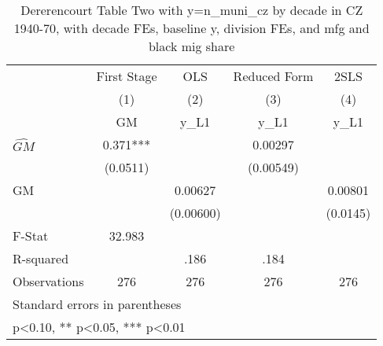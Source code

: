 \begin{table}[htbp]\centering
\def\sym#1{\ifmmode^{#1}\else\(^{#1}\)\fi}
\caption{Dererencourt Table Two with y=n\_muni\_cz by decade in CZ 1940-70, with decade FEs, baseline y, division FEs, and mfg and black mig share}
\begin{tabular}{l*{4}{c}}
\toprule
                    & First Stage   &         OLS   &Reduced Form   &        2SLS   \\
                    &\multicolumn{1}{c}{(1)}&\multicolumn{1}{c}{(2)}&\multicolumn{1}{c}{(3)}&\multicolumn{1}{c}{(4)}\\
                    &\multicolumn{1}{c}{GM}&\multicolumn{1}{c}{y\_L1}&\multicolumn{1}{c}{y\_L1}&\multicolumn{1}{c}{y\_L1}\\
\midrule
$\hat{GM}$          &       0.371***&               &     0.00297   &               \\
                    &    (0.0511)   &               &   (0.00549)   &               \\
\addlinespace
GM                  &               &     0.00627   &               &     0.00801   \\
                    &               &   (0.00600)   &               &    (0.0145)   \\
\midrule
F-Stat              &      32.983   &               &               &               \\
R-squared           &               &        .186   &        .184   &               \\
Observations        &         276   &         276   &         276   &         276   \\
\bottomrule
\multicolumn{5}{l}{\footnotesize Standard errors in parentheses}\\
\multicolumn{5}{l}{\footnotesize * p<0.10, ** p<0.05, *** p<0.01}\\
\end{tabular}
\end{table}
